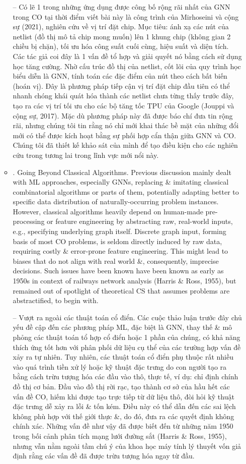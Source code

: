 \documentclass{article}
\begin{document}
\begin{itemize}
\begin{itemize}
        -- Có lẽ 1 trong những ứng dụng được công bố rộng rãi nhất của GNN trong CO tại thời điểm viết bài này là công trình của Mirhoseini và cộng sự (2021), nghiên cứu về vị trí đặt chip. Mục tiêu: ánh xạ các nút của netlist (đồ thị mô tả chip mong muốn) lên 1 khung chip (không gian 2 chiều bị chặn), tối ưu hóa công suất cuối cùng, hiệu suất và diện tích. Các tác giả coi đây là 1 vấn đề tổ hợp và giải quyết nó bằng cách sử dụng học tăng cường. Nhờ cấu trúc đồ thị của netlist, cốt lõi của quy trình học biểu diễn là GNN, tính toán các đặc điểm của nút theo cách bất biến (hoán vị). Đây là phương pháp tiếp cận vị trí đặt chip đầu tiên có thể nhanh chóng khái quát hóa thành các netlist chưa từng thấy trước đây, tạo ra các vị trí tối ưu cho các bộ tăng tốc TPU của Google (Jouppi và cộng sự, 2017). Mặc dù phương pháp này đã được báo chí đưa tin rộng rãi, nhưng chúng tôi tin rằng nó chỉ mới khai thác bề mặt của những đổi mới có thể được kích hoạt bằng sự phối hợp cẩn thận giữa GNN và CO. Chúng tôi đã thiết kế khảo sát của mình để tạo điều kiện cho các nghiên cứu trong tương lai trong lĩnh vực mới nổi này.
        \item {. Going Beyond Classical Algorithms.} Previous discussion mainly dealt with ML approaches, especially GNNs, replacing \& imitating classical combinatorial algorithms or parts of them, potentially adapting better to specific data distribution of naturally-occurring problem instances. However, classical algorithms heavily depend on human-made pre-processing or feature engineering by abstracting raw, real-world inputs, e.g., specifying underlying graph itself. Discrete graph input, forming basis of most CO problems, is seldom directly induced by raw data, requiring costly \& error-prone feature engineering. This might lead to biases that do not align with real world \&, consequently, imprecise decisions. Such issues have been known have been known as early as 1950s in context of railways network analysis (Harris \& Ross, 1955), but remained out of spotlight of theoretical CS that assumes problems are abstractified, to begin with.

        -- {\sf Vượt ra ngoài các thuật toán cổ điển.} Các cuộc thảo luận trước đây chủ yếu đề cập đến các phương pháp ML, đặc biệt là GNN, thay thế \& mô phỏng các thuật toán tổ hợp cổ điển hoặc 1 phần của chúng, có khả năng thích ứng tốt hơn với phân phối dữ liệu cụ thể của các trường hợp vấn đề xảy ra tự nhiên. Tuy nhiên, các thuật toán cổ điển phụ thuộc rất nhiều vào quá trình tiền xử lý hoặc kỹ thuật đặc trưng do con người tạo ra bằng cách trừu tượng hóa các đầu vào thô, thực tế, ví dụ: chỉ định chính đồ thị cơ bản. Đầu vào đồ thị rời rạc, tạo thành cơ sở của hầu hết các vấn đề CO, hiếm khi được tạo trực tiếp từ dữ liệu thô, đòi hỏi kỹ thuật đặc trưng dễ xảy ra lỗi \& tốn kém. Điều này có thể dẫn đến các sai lệch không phù hợp với thế giới thực \&, do đó, đưa ra các quyết định không chính xác. Những vấn đề như vậy đã được biết đến từ những năm 1950 trong bối cảnh phân tích mạng lưới đường sắt (Harris \& Ross, 1955), nhưng vẫn nằm ngoài tầm chú ý của khoa học máy tính lý thuyết vốn giả định rằng các vấn đề đã được trừu tượng hóa ngay từ đầu.


\end{itemize}
\end{itemize}
\end{document}
